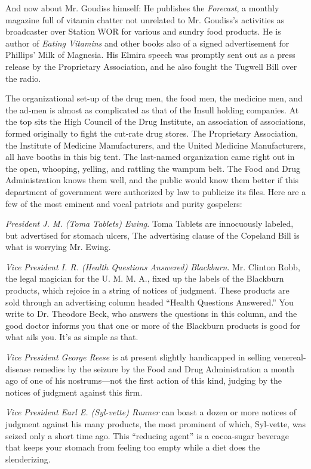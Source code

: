 \documentclass[twoside,nohyper,openany,nobib]{tufte-book}
\begin{document}
And now about Mr. Goudiss himself: He publishes the \emph{Forecast}, a
monthly magazine full of vitamin chatter not unrelated to Mr. Goudiss's
activities as broadcaster over Station WOR for various and sundry food
products. He is author of \emph{Eating Vitamins} and other books also of
a signed advertisement for Phillips' Milk of Magnesia. His Elmira speech
was promptly sent out as a press release by the Proprietary Association,
and he also fought the Tugwell Bill over the radio.

The organizational set-up of the drug men, the food men, the medicine
men, and the ad-men is almost as complicated as that of the Insull
holding companies. At the top sits the High Council of the Drug
Institute, an association of associations, formed originally to fight
the cut-rate drug stores. The Proprietary Association, the Institute of
Medicine Manufacturers, and the United Medicine Manufacturers, all have
booths in this big tent. The last-named organization came right out in
the open, whooping, yelling, and rattling the wampum belt. The Food and
Drug Administration knows them well, and the public would know them
better if this department of government were authorized by law to
publicize its files. Here are a few of the most eminent and vocal
patriots and purity gospelers:

\emph{President J. M. (Toma Tablets) Ewing}. Toma Tablets are
innocuously labeled, but advertised for stomach ulcers, The advertising
clause of the Copeland Bill is what is worrying Mr. Ewing.

\emph{Vice President I. R. (Health Questions Answered) Blackburn}. Mr.
Clinton Robb, the legal magician for the U. M. M. A., fixed up the
labels of the Blackburn products, which rejoice in a string of notices
of judgment. These products are sold through an advertising column
headed ``Health Questions Answered.'' You write to Dr. Theodore Beck,
who answers the questions in this column, and the good doctor informs
you that one or more of the Blackburn products is good for what ails
you. It's as simple as that.

\emph{Vice President George Reese} is at present slightly handicapped in
selling venereal-disease remedies by the seizure by the Food and Drug
Administration a month ago of one of his nostrums---not the first action
of this kind, judging by the notices of judgment against this firm.

\emph{Vice President Earl E. (Syl-vette) Runner} can boast a dozen or
more notices of judgment against his many products, the most prominent
of which, Syl-vette, was seized only a short time ago. This ``reducing
agent'' is a cocoa-sugar beverage that keeps your stomach from feeling
too empty while a diet does the slenderizing.
\end{document}
